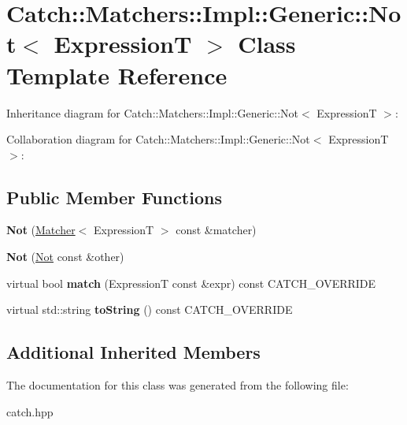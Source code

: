 \hypertarget{classCatch_1_1Matchers_1_1Impl_1_1Generic_1_1Not}{}\section{Catch\+:\+:Matchers\+:\+:Impl\+:\+:Generic\+:\+:Not$<$ ExpressionT $>$ Class Template Reference}
\label{classCatch_1_1Matchers_1_1Impl_1_1Generic_1_1Not}


Inheritance diagram for Catch\+:\+:Matchers\+:\+:Impl\+:\+:Generic\+:\+:Not$<$ ExpressionT $>$\+:


Collaboration diagram for Catch\+:\+:Matchers\+:\+:Impl\+:\+:Generic\+:\+:Not$<$ ExpressionT $>$\+:
\subsection*{Public Member Functions}
\begin{DoxyCompactItemize}
\item 
{\bfseries Not} (\hyperlink{structCatch_1_1Matchers_1_1Impl_1_1Matcher}{Matcher}$<$ ExpressionT $>$ const \&matcher)\hypertarget{classCatch_1_1Matchers_1_1Impl_1_1Generic_1_1Not_a9b99e3ce49c1a16931708b67c312f204}{}\label{classCatch_1_1Matchers_1_1Impl_1_1Generic_1_1Not_a9b99e3ce49c1a16931708b67c312f204}

\item 
{\bfseries Not} (\hyperlink{classCatch_1_1Matchers_1_1Impl_1_1Generic_1_1Not}{Not} const \&other)\hypertarget{classCatch_1_1Matchers_1_1Impl_1_1Generic_1_1Not_a46eccbbaeec259d3536aa2a29f95208f}{}\label{classCatch_1_1Matchers_1_1Impl_1_1Generic_1_1Not_a46eccbbaeec259d3536aa2a29f95208f}

\item 
virtual bool {\bfseries match} (ExpressionT const \&expr) const C\+A\+T\+C\+H\+\_\+\+O\+V\+E\+R\+R\+I\+DE\hypertarget{classCatch_1_1Matchers_1_1Impl_1_1Generic_1_1Not_a18c49fc6fb73a42d54650dafc18c7db1}{}\label{classCatch_1_1Matchers_1_1Impl_1_1Generic_1_1Not_a18c49fc6fb73a42d54650dafc18c7db1}

\item 
virtual std\+::string {\bfseries to\+String} () const C\+A\+T\+C\+H\+\_\+\+O\+V\+E\+R\+R\+I\+DE\hypertarget{classCatch_1_1Matchers_1_1Impl_1_1Generic_1_1Not_ab970a4a6e58a987451e0b0e0e60a0bff}{}\label{classCatch_1_1Matchers_1_1Impl_1_1Generic_1_1Not_ab970a4a6e58a987451e0b0e0e60a0bff}

\end{DoxyCompactItemize}
\subsection*{Additional Inherited Members}


The documentation for this class was generated from the following file\+:\begin{DoxyCompactItemize}
\item 
catch.\+hpp\end{DoxyCompactItemize}
